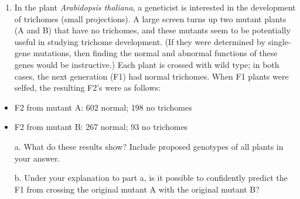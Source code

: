 \documentclass[11pt,]{article}
\providecommand{\tightlist}{%
  \setlength{\itemsep}{0pt}\setlength{\parskip}{0pt}}
\begin{document}
\begin{blackbox}

\begin{enumerate}
\def\labelenumi{\arabic{enumi}.}
\setcounter{enumi}{39}
\tightlist
\item
  In the plant \emph{Arabidopsis thaliana}, a geneticist is interested
  in the development of trichomes (small projections). A large screen
  turns up two mutant plants (A and B) that have no trichomes, and these
  mutants seem to be potentially useful in studying trichome
  development. (If they were determined by single-gene mutations, then
  finding the normal and abnormal functions of these genes would be
  instructive.) Each plant is crossed with wild type; in both cases, the
  next generation (F1) had normal trichomes. When F1 plants were selfed,
  the resulting F2's were as follows:
\end{enumerate}

\vspace{8mm}

\begin{itemize}
\tightlist
\item
  F2 from mutant A: 602 normal; 198 no trichomes
\item
  F2 from mutant B: 267 normal; 93 no trichomes
\end{itemize}

\vspace{8mm}

\begin{enumerate} 
 \item[a.]{ What do these results show? Include proposed genotypes of all plants in your answer. } 
 \item[b.]{ Under your explanation to part a, is it possible to confidently predict the F1 from crossing the original mutant A with the original mutant B?  } 
 \end{enumerate}

\vspace{12cm}

\end{blackbox}
\end{document}
